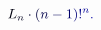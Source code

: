 \documentclass[12pt]{article}
\begin{document}
\makeatletter
\renewcommand*{\@textcolor}[3]{%
  \protect\leavevmode
  \begingroup
    \color#1{#2}#3%
  \endgroup
}
\makeatother
\begin{displaymath}
\mathcolor[RGB]{0,0,15}{L} _ { \mathcolor[RGB]{0,0,30}{n} } \mathcolor[RGB]{0,0,45}{\cdot} \mathcolor[RGB]{0,0,60}{(} \mathcolor[RGB]{0,0,75}{n} \mathcolor[RGB]{0,0,90}{-} \mathcolor[RGB]{0,0,105}{1} \mathcolor[RGB]{0,0,120}{)} \mathcolor[RGB]{0,0,135}{!} ^ { \mathcolor[RGB]{0,0,150}{n} } \mathcolor[RGB]{0,0,165}{.}
\end{displaymath}
\end{document}
